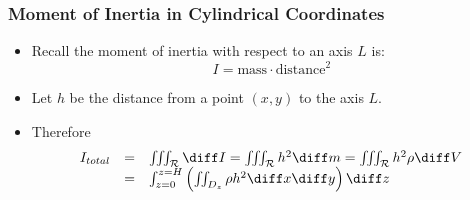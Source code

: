 \begin{frame}
\frametitle{Moment of Inertia in Cylindrical Coordinates}
\begin{itemize}
\item Recall the moment of inertia with respect to an axis $L$ is:
\[
I = \text{mass} \cdot \text{distance}^2
\]
\item Let $h$ be the distance from a point $(x,y)$ to the axis $L$. 
\item Therefore
\[
\begin{array}{rcl}
I_{total}&=& \iiint_{\mathcal{R}} \diff I = \iiint_{\mathcal{R}} h^2 \diff m =\iiint_{\mathcal{R}} h^2  \rho  \diff V \\
&=& \int_{z=0}^{z=H} \left( \iint_{D_z} \rho h^2  \diff x\diff y \right)  \diff z 
\end{array}
\]
\end{itemize}
\end{frame}